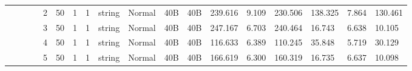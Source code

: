 \begin{landscape}
\begin{table}[]
{\begin{tabular}{@{}ccccllllllllllllll@{}}
                                                                                   &                              &                                &                                                                                                          & 2                                                     & 50                                       & 1                                          & 1                                 & string                           & Normal                             & 40B                                           & 40B                                             & 239.616                 & 9.109    & 230.506                      & 138.325                 & 7.864    & 130.461                      \\
                                                                                   &                              &                                &                                                                                                          & 3                                                     & 50                                       & 1                                          & 1                                 & string                           & Normal                             & 40B                                           & 40B                                             & 247.167                 & 6.703    & 240.464                      & 16.743                  & 6.638    & 10.105                       \\
                                                                                   &                              &                                &                                                                                                          & 4                                                     & 50                                       & 1                                          & 1                                 & string                           & Normal                             & 40B                                           & 40B                                             & 116.633                 & 6.389    & 110.245                      & 35.848                  & 5.719    & 30.129                       \\
                                                                                   &                              &                                &                                                                                                          & 5                                                     & 50                                       & 1                                          & 1                                 & string                           & Normal                             & 40B                                           & 40B                                             & 166.619                 & 6.300    & 160.319                      & 16.735                  & 6.637    & 10.098                       \\

\end{tabular}}
\end{table}
\end{landscape}
